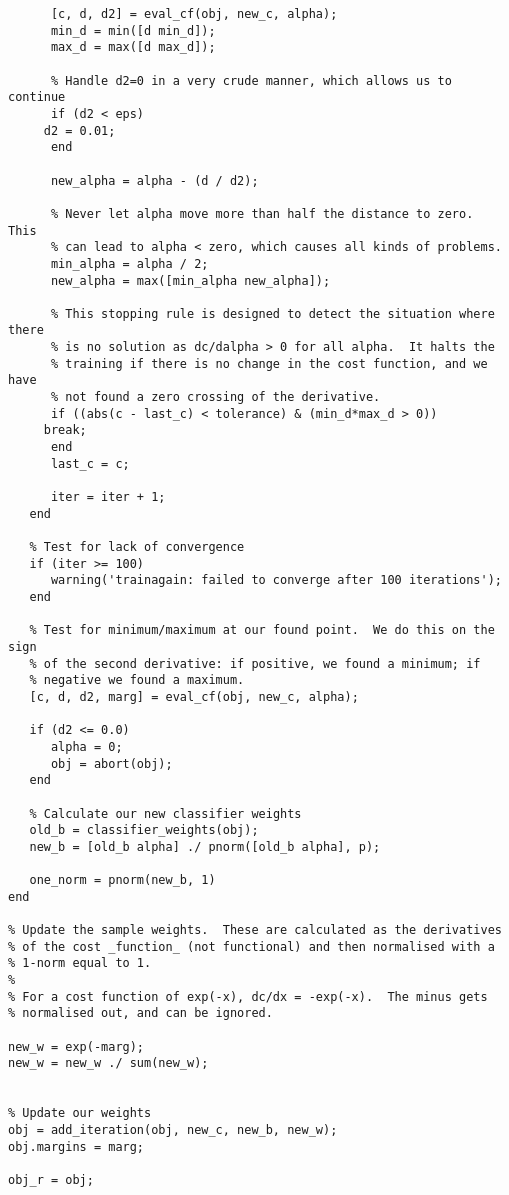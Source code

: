 \begin{verbatim}
      [c, d, d2] = eval_cf(obj, new_c, alpha);
      min_d = min([d min_d]);
      max_d = max([d max_d]);
      
      % Handle d2=0 in a very crude manner, which allows us to continue
      if (d2 < eps)
	 d2 = 0.01;
      end
      
      new_alpha = alpha - (d / d2);
      
      % Never let alpha move more than half the distance to zero.  This
      % can lead to alpha < zero, which causes all kinds of problems.
      min_alpha = alpha / 2;
      new_alpha = max([min_alpha new_alpha]);
      
      % This stopping rule is designed to detect the situation where there
      % is no solution as dc/dalpha > 0 for all alpha.  It halts the
      % training if there is no change in the cost function, and we have
      % not found a zero crossing of the derivative.
      if ((abs(c - last_c) < tolerance) & (min_d*max_d > 0))
	 break;
      end
      last_c = c;
      
      iter = iter + 1;
   end

   % Test for lack of convergence
   if (iter >= 100)
      warning('trainagain: failed to converge after 100 iterations');
   end
   
   % Test for minimum/maximum at our found point.  We do this on the sign
   % of the second derivative: if positive, we found a minimum; if
   % negative we found a maximum.
   [c, d, d2, marg] = eval_cf(obj, new_c, alpha);
   
   if (d2 <= 0.0)
      alpha = 0;
      obj = abort(obj);
   end
   
   % Calculate our new classifier weights   
   old_b = classifier_weights(obj);
   new_b = [old_b alpha] ./ pnorm([old_b alpha], p);

   one_norm = pnorm(new_b, 1)
end

% Update the sample weights.  These are calculated as the derivatives
% of the cost _function_ (not functional) and then normalised with a
% 1-norm equal to 1.
%
% For a cost function of exp(-x), dc/dx = -exp(-x).  The minus gets
% normalised out, and can be ignored.

new_w = exp(-marg);
new_w = new_w ./ sum(new_w);


% Update our weights
obj = add_iteration(obj, new_c, new_b, new_w);
obj.margins = marg;

obj_r = obj;
\end{verbatim}
